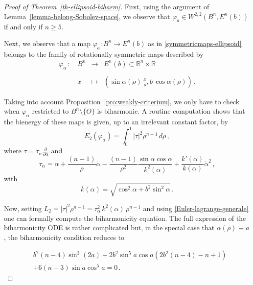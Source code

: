 \documentclass[11pt]{amsart}
\theoremstyle{plain}
\theoremstyle{definition}
\numberwithin{equation}{section}
\def \R{{\mathbb R}}
\numberwithin{equation}{section}
\begin{document}
\begin{proof}[Proof of Theorem~\ref{th-ellipsoid-biharm}] First, using the argument of Lemma~\ref{lemma-belong-Sobolev-space}, we observe that $\varphi_a \in  W^{2,2}\left ( B^n,E^n(b) \right )$ if and only if $n \geq 5$.

Next, we observe that a map $\varphi_a:B^n \to E^n(b)$ as in \eqref{symmetricmaps-ellipsoid} belongs to the family of rotationally symmetric maps described by
\begin{equation}\label{symmetricmaps-ellipsoid-general}\begin{array}{lcll}
                                           \varphi_{\alpha} \,:\, &B^n &\to &  E^n(b) \subset \R^n \times \R \\
                                           &&& \\
                                           &x &\mapsto & ( \sin \alpha(\rho)\,\frac{x}{\rho}, b\,\cos \alpha(\rho)) \, .
                                         \end{array}
\end{equation}

Taking into account Proposition~\ref{pro:weakly-criterium}, we only have to check when $\varphi_{\alpha}$ restricted to $B^n\setminus\{O\}$ is biharmonic. A routine computation shows that the bienergy of these maps is given, up to an irrelevant constant factor, by
\begin{equation}\label{eq-bienergy-ellipsoid}
E_2\left( \varphi_\alpha \right )=\int_0^1 |\tau|^2 \rho^{n-1}\,d\rho \,,
\end{equation}
where
$\tau=\tau_\alpha \frac{\partial}{\partial \alpha}$ and 
\begin{equation}\label{eq-tau-Enb}
\tau_\alpha= \ddot{\alpha}+\frac{(n-1)}{\rho}\dot \alpha-\frac{(n-1)}{\rho^2} \frac{\sin \alpha \cos \alpha}{k^2(\alpha)}+\frac{k'(\alpha)}{k(\alpha)} \dot{\alpha}^2 \,,
\end{equation}
with 
$$k(\alpha)= \sqrt{\cos^2 \alpha + b^2 \sin^2 \alpha}\,.$$

Now, setting $L_2=|\tau|^2 \rho^{n-1}=\tau_\alpha^2\, k^2(\alpha)\, \rho^{n-1}$ and using \eqref{Euler-lagrange-generale} one can formally compute the biharmonicity equation. The full expression of the biharmonicity ODE is rather complicated but, in the special case that $\alpha(\rho)\equiv a$, the biharmonicity condition reduces to

\begin{equation}\label{eq-biharmonicity-condition-ellipsoid}
\begin{split}
&b^2 (n-4) \sin ^3(2 a)+2 b^2 \sin ^5 a \cos a \left(2 b^2 (n-4)-n+1\right)\\
&+6 (n-3) \sin a \cos ^5 a=0 \,.
\end{split}
\end{equation}


\end{proof}
\end{document}

